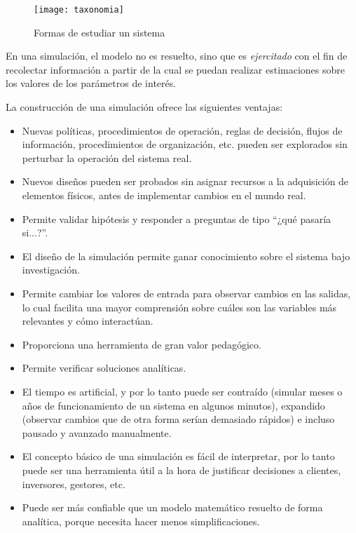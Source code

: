 \begin{figure}[h]
\caption{Formas de estudiar un sistema \cite{law}}
\centering
\texttt{[image: taxonomia]}
\end{figure}

En una simulación, el modelo no es resuelto, sino que es \textit{ejercitado}
con el fin de recolectar información a partir de la cual se puedan realizar
estimaciones sobre los valores de los parámetros de interés.

La construcción de una simulación ofrece las siguientes ventajas:
\begin{itemize}
    \item Nuevas políticas, procedimientos de operación, reglas de decisión,
    flujos de información, procedimientos de organización, etc. pueden ser
    explorados sin perturbar la operación del sistema real.

    \item Nuevos diseños pueden ser probados sin asignar recursos a la
    adquisición de elementos físicos, antes de implementar cambios en el mundo
    real.

    \item Permite validar hipótesis y responder a preguntas de tipo ``¿qué
    pasaría si...?''.

    \item El diseño de la simulación permite ganar conocimiento sobre el
    sistema bajo investigación.

    \item Permite cambiar los valores de entrada para observar cambios en las
    salidas, lo cual facilita una mayor comprensión sobre cuáles son las
    variables más relevantes y cómo interactúan.

    \item Proporciona una herramienta de gran valor pedagógico.

    \item Permite verificar soluciones analíticas.

    \item El tiempo es artificial, y por lo tanto puede ser contraído (simular
    meses o años de funcionamiento de un sistema en algunos minutos), expandido
    (observar cambios que de otra forma serían demasiado rápidos) e incluso
    pausado y avanzado manualmente.

    \item El concepto básico de una simulación es fácil de interpretar, por lo
    tanto puede ser una herramienta útil a la hora de justificar decisiones a
    clientes, inversores, gestores, etc.

    \item Puede ser más confiable que un modelo matemático resuelto de forma
    analítica, porque necesita hacer menos simplificaciones.
\end{itemize}

